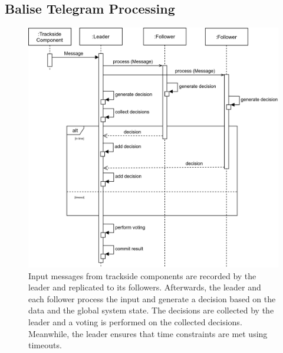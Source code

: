 \subsection{Balise Telegram Processing}
\label{subsec:ImpBaliseProcessing}
\begin{figure}[!hb]
	\centering
	\includegraphics[width=0.75\linewidth]{images/sequence/CollectResults}
	\caption{Input messages from trackside components are recorded by the leader and replicated to its followers. Afterwards, the leader and each follower process the input and generate a decision based on the data and the global system state. The decisions are collected by the leader and a voting is performed on the collected decisions. Meanwhile, the leader ensures that time constraints are met using timeouts.}
	\label{fig:SeqCollectResults}
\end{figure}

